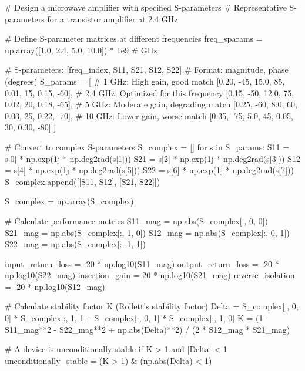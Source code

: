 \documentclass[11pt,a4paper]{article}
\begin{document}
\begin{pycode}
# Design a microwave amplifier with specified S-parameters
# Representative S-parameters for a transistor amplifier at 2.4 GHz

# Define S-parameter matrices at different frequencies
freq_sparams = np.array([1.0, 2.4, 5.0, 10.0]) * 1e9  # GHz

# S-parameters: [freq_index, S11, S21, S12, S22]
# Format: magnitude, phase (degrees)
S_params = [
    # 1 GHz: High gain, good match
    [0.20, -45, 15.0, 85, 0.01, 15, 0.15, -60],
    # 2.4 GHz: Optimized for this frequency
    [0.15, -50, 12.0, 75, 0.02, 20, 0.18, -65],
    # 5 GHz: Moderate gain, degrading match
    [0.25, -60, 8.0, 60, 0.03, 25, 0.22, -70],
    # 10 GHz: Lower gain, worse match
    [0.35, -75, 5.0, 45, 0.05, 30, 0.30, -80]
]

# Convert to complex S-parameters
S_complex = []
for s in S_params:
    S11 = s[0] * np.exp(1j * np.deg2rad(s[1]))
    S21 = s[2] * np.exp(1j * np.deg2rad(s[3]))
    S12 = s[4] * np.exp(1j * np.deg2rad(s[5]))
    S22 = s[6] * np.exp(1j * np.deg2rad(s[7]))
    S_complex.append([[S11, S12], [S21, S22]])

S_complex = np.array(S_complex)

# Calculate performance metrics
S11_mag = np.abs(S_complex[:, 0, 0])
S21_mag = np.abs(S_complex[:, 1, 0])
S12_mag = np.abs(S_complex[:, 0, 1])
S22_mag = np.abs(S_complex[:, 1, 1])

input_return_loss = -20 * np.log10(S11_mag)
output_return_loss = -20 * np.log10(S22_mag)
insertion_gain = 20 * np.log10(S21_mag)
reverse_isolation = -20 * np.log10(S12_mag)

# Calculate stability factor K (Rollett's stability factor)
Delta = S_complex[:, 0, 0] * S_complex[:, 1, 1] - S_complex[:, 0, 1] * S_complex[:, 1, 0]
K = (1 - S11_mag**2 - S22_mag**2 + np.abs(Delta)**2) / (2 * S12_mag * S21_mag)

# A device is unconditionally stable if K > 1 and |Delta| < 1
unconditionally_stable = (K > 1) & (np.abs(Delta) < 1)


\end{pycode}
\end{document}
